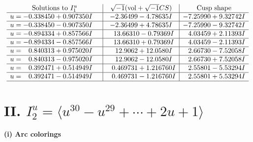 \documentclass[1p]{elsarticle_modified}
\theoremstyle{definition}
\newcommand{\I}{\sqrt{-1}}
\begin{document}
$$\begin{array}{c|c|c}  
\text{Solutions to }I^u_{1}& \I (\text{vol} + \sqrt{-1}CS) & \text{Cusp shape}\\
 \hline 
\begin{aligned}
u &= -0.338450 + 0.907350 I\end{aligned}
 & -2.36499 - 4.78635 I & -7.25990 + 9.32742 I \\ \hline\begin{aligned}
u &= -0.338450 - 0.907350 I\end{aligned}
 & -2.36499 + 4.78635 I & -7.25990 - 9.32742 I \\ \hline\begin{aligned}
u &= -0.894334 + 0.857566 I\end{aligned}
 & \phantom{-}13.66310 - 0.79369 I & \phantom{-}4.03459 + 2.11393 I \\ \hline\begin{aligned}
u &= -0.894334 - 0.857566 I\end{aligned}
 & \phantom{-}13.66310 + 0.79369 I & \phantom{-}4.03459 - 2.11393 I \\ \hline\begin{aligned}
u &= \phantom{-}0.840313 + 0.975020 I\end{aligned}
 & \phantom{-}12.9062 + 12.0580 I & \phantom{-}2.66730 - 7.52058 I \\ \hline\begin{aligned}
u &= \phantom{-}0.840313 - 0.975020 I\end{aligned}
 & \phantom{-}12.9062 - 12.0580 I & \phantom{-}2.66730 + 7.52058 I \\ \hline\begin{aligned}
u &= \phantom{-}0.392471 + 0.514949 I\end{aligned}
 & \phantom{-}0.469731 + 1.216760 I & \phantom{-}2.55801 - 5.53294 I \\ \hline\begin{aligned}
u &= \phantom{-}0.392471 - 0.514949 I\end{aligned}
 & \phantom{-}0.469731 - 1.216760 I & \phantom{-}2.55801 + 5.53294 I\\
 \hline 
 \end{array}$$\newpage\newpage\renewcommand{\arraystretch}{1}
\centering \section*{II. $I^u_{2}= \langle u^{30}- u^{29}+\cdots+2 u+1 \rangle$}
\flushleft \textbf{(i) Arc colorings}\\
\end{document}
